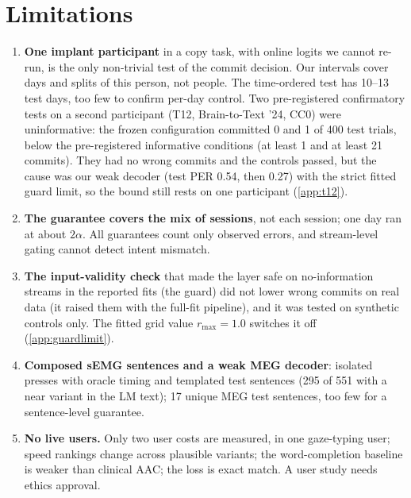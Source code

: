 \section{Limitations}
\label{sec:limitations}

\begin{enumerate}[leftmargin=*,itemsep=0pt]
  \item \textbf{One implant participant} in a copy task, with online logits we cannot re-run, is the only non-trivial test of the commit decision. Our intervals cover days and splits of this person, not people. The time-ordered test has 10--13 test days, too few to confirm per-day control. Two pre-registered confirmatory tests on a second participant (T12, Brain-to-Text '24, CC0) were uninformative: the frozen configuration committed 0 and 1 of 400 test trials, below the pre-registered informative conditions (at least 1 and at least 21 commits). They had no wrong commits and the controls passed, but the cause was our weak decoder (test PER 0.54, then 0.27) with the strict fitted guard limit, so the bound still rests on one participant (\cref{app:t12}).
  \item \textbf{The guarantee covers the mix of sessions}, not each session; one day ran at about $2\alpha$. All guarantees count only observed errors, and stream-level gating cannot detect intent mismatch.
  \item \textbf{The input-validity check} that made the layer safe on no-information streams in the reported fits (the guard) did not lower wrong commits on real data (it raised them with the full-fit pipeline), and it was tested on synthetic controls only. The fitted grid value $r_{\max} = 1.0$ switches it off (\cref{app:guardlimit}).
  \item \textbf{Composed sEMG sentences and a weak MEG decoder}: isolated presses with oracle timing and templated test sentences (295 of 551 with a near variant in the LM text); 17 unique MEG test sentences, too few for a sentence-level guarantee.
  \item \textbf{No live users.} Only two user costs are measured, in one gaze-typing user; speed rankings change across plausible variants; the word-completion baseline is weaker than clinical AAC; the loss is exact match. A user study needs ethics approval.
\end{enumerate}
